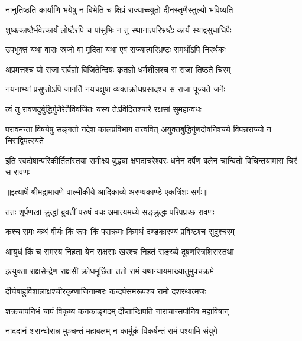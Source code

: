 \twolineshloka
{नानुतिष्ठति कार्याणि भयेषु न बिभेति च}
{क्षिप्रं राज्याच्च्युतो दीनस्तृणैस्तुल्यो भविष्यति} %

\twolineshloka
{शुष्ककाष्ठैर्भवेत्कार्यं लोष्टैरपि च पांसुभिः}
{न तु स्थानात्परिभ्रष्टैः कार्यं स्याद्वसुधाधिपैः} %

\twolineshloka
{उपभुक्तं यथा वासः स्रजो वा मृदिता यथा}
{एवं राज्यात्परिभ्रष्टः समर्थोऽपि निरर्थकः} %

\twolineshloka
{अप्रमत्तश्च यो राजा सर्वज्ञो विजितेन्द्रियः}
{कृतज्ञो धर्मशीलश्च स राजा तिष्ठते चिरम्} %

\twolineshloka
{नयनाभ्यां प्रसुप्तोऽपि जागर्ति नयचक्षुषा}
{व्यक्तक्रोधप्रसादश्च स राजा पूज्यते जनैः} %

\twolineshloka
{त्वं तु रावणदुर्बुद्धिर्गुणैरेतैर्विवर्जितः}
{यस्य तेऽविदितश्चारै रक्षसां सुमहान्वधः} %

\fourlineindentedshloka
{परावमन्ता विषयेषु सङ्गतो}
{नदेश कालप्रविभाग तत्त्ववित्}
{अयुक्तबुद्धिर्गुणदोषनिश्चये}
{विपन्नराज्यो न चिराद्विपत्स्यते} %

\fourlineindentedshloka
{इति स्वदोषान्परिकीर्तितांस्तया}
{समीक्ष्य बुद्ध्या क्षणदाचरेश्वरः}
{धनेन दर्पेण बलेन चान्वितो}
{विचिन्तयामास चिरं स रावणः} %


{॥इत्यार्षे श्रीमद्रामायणे वाल्मीकीये आदिकाव्ये अरण्यकाण्डे एकत्रिंशः सर्गः॥}


\twolineshloka
{ततः शूर्पणखां क्रुद्धां ब्रुवतीं परुषं वचः}
{अमात्यमध्ये सङ्क्रुद्धः परिपप्रच्छ रावणः} %

\twolineshloka
{कश्च रामः कथं वीर्यः किं रूपः किं पराक्रमः}
{किमर्थं दण्डकारण्यं प्रविष्टश्च सुदुश्चरम्} %

\twolineshloka
{आयुधं किं च रामस्य निहता येन राक्षसाः}
{खरश्च निहतं सङ्ख्ये दूषणस्त्रिशिरास्तथा} %

\twolineshloka
{इत्युक्ता राक्षसेन्द्रेण राक्षसी क्रोधमूर्छिता}
{ततो रामं यथान्यायमाख्यातुमुपचक्रमे} %

\twolineshloka
{दीर्घबाहुर्विशालाक्षश्चीरकृष्णाजिनाम्बरः}
{कन्दर्पसमरूपश्च रामो दशरथात्मजः} %

\twolineshloka
{शक्रचापनिभं चापं विकृष्य कनकाङ्गदम्}
{दीप्तान्क्षिपति नाराचान्सर्पानिव महाविषान्} %

\twolineshloka
{नाददानं शरान्घोरान्न मुञ्चन्तं महाबलम्}
{न कार्मुकं विकर्षन्तं रामं पश्यामि संयुगे} %

